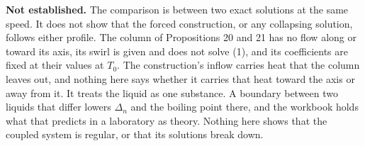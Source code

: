 \textbf{Not established.} The comparison is between two exact solutions at the same speed. It does
not show that the forced construction, or any collapsing solution, follows either profile. The
column of Propositions 20 and 21 has no flow along or toward its axis, its swirl is given and does
not solve (1), and its coefficients are fixed at their values at $T_0$. The construction's inflow
carries heat that the column leaves out, and nothing here says whether it carries that heat toward
the axis or away from it. It treats the
liquid as one substance. A boundary between two liquids that differ lowers $\Delta_n$ and the
boiling point there, and the workbook holds what that predicts in a laboratory as theory. Nothing
here shows that the coupled system is regular, or that its solutions break down.
